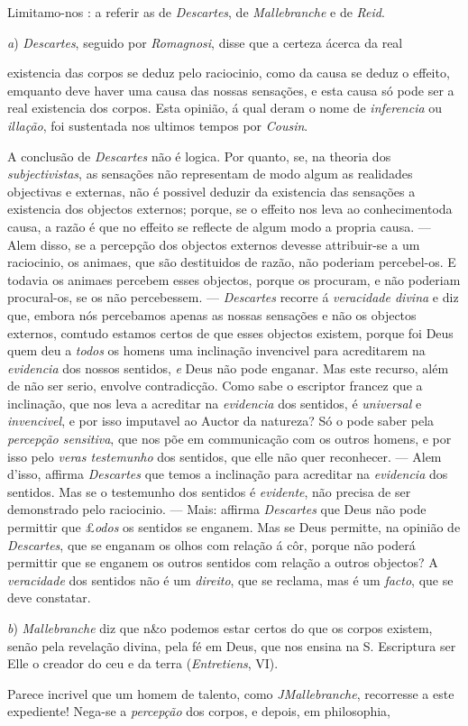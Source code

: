 Limitamo-nos : \textbar{} a referir as de \emph{Descartes}, de \emph{Mallebranche} e de \emph{Reid}. \textbar{}\par \emph{a}) \emph{Descartes}, seguido por \emph{Romagnosi}, disse que a certeza ácerca da real \textbar{}\par existencia das corpos se deduz pelo raciocinio, como da causa se deduz o effeito, emquanto deve haver uma causa das nossas sensações, e esta causa só pode ser a real existencia dos corpos. Esta opinião, á qual deram o nome \textbar{} de \emph{inferencia} ou \emph{illação}, foi sustentada nos ultimos tempos por \emph{Cousin}. \textbar{}\par A conclusão de \emph{Descartes} não é logica. Por quanto, se, na theoria dos \textbar{} \emph{subjectivistas}, as sensações não representam de modo algum as realidades \textbar{} objectivas e externas, não é possivel deduzir da existencia das sensações a \textbar{} existencia dos objectos externos; porque, se o effeito nos leva ao conhecimentoda causa, a razão é que no effeito se reflecte de algum modo a propria causa. --- Alem disso, se a percepção dos objectos externos devesse attribuir-se a um raciocinio, os animaes, que são destituidos de razão, não poderiam percebel-os. E todavia os animaes percebem esses objectos, porque os procuram, e não poderiam procural-os, se os não percebessem. --- \emph{Descartes} recorre á \emph{veracidade divina} e diz que, embora nós percebamos apenas as nossas sensações e não os objectos externos, comtudo estamos certos de que esses objectos existem, porque foi Deus quem deu a \emph{todos} os homens uma inclinação invencivel para acreditarem na \emph{evidencia} dos nossos sentidos, \emph{e} Deus não pode enganar. Mas este recurso, além de não ser serio, envolve contradicção. Como sabe o escriptor francez que a inclinação, que nos leva a acreditar na \emph{evidencia} dos sentidos, é \emph{universal} e \emph{invencivel}, e por isso imputavel ao Auctor da natureza? Só o pode saber pela \emph{percepção sensitiva}, que nos põe em communicação com os outros homens, e por isso pelo \emph{veras testemunho} dos sentidos, que elle não quer reconhecer. --- Alem d'isso, affirma \emph{Descartes} que temos a inclinação para acreditar na \emph{evidencia} dos sentidos. Mas se o testemunho dos sentidos é \emph{evidente}, não precisa de ser demonstrado pelo raciocinio. --- Mais: affirma \emph{Descartes} que Deus não pode permittir que £\emph{odos} os sentidos se enganem. Mas se Deus permitte, na opinião de \emph{Descartes}, que se enganam os olhos com relação á côr, porque não poderá permittir que se enganem os outros sentidos com relação a outros objectos? A \emph{veracidade} dos sentidos não é um \emph{direito}, que se reclama, mas é um \emph{facto}, que se deve constatar.\par \emph{b}) \emph{Mallebranche} diz que n\&o podemos estar certos do que os corpos existem, senão pela revelação divina, pela fé em Deus, que nos ensina na S. Escriptura ser Elle o creador do ceu e da terra (\emph{Entretiens}, VI).\par Parece incrivel que um homem de talento, como \emph{JMallebranche}, recorresse a este expediente! Nega-se a \emph{percepção} dos corpos, e depois, em philosophia, 